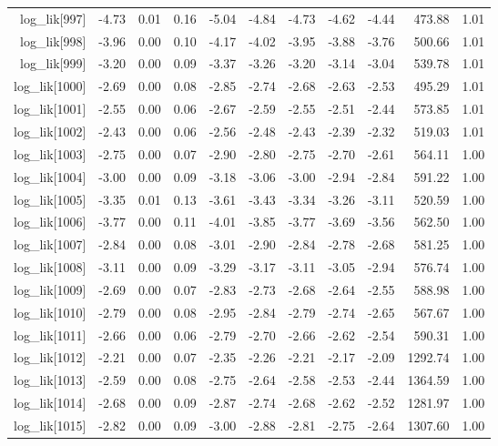 \begin{table}[ht]
\begin{tabular}{rrrrrrrrrrr}
  log\_lik[997] & -4.73 & 0.01 & 0.16 & -5.04 & -4.84 & -4.73 & -4.62 & -4.44 & 473.88 & 1.01 \\ 
  log\_lik[998] & -3.96 & 0.00 & 0.10 & -4.17 & -4.02 & -3.95 & -3.88 & -3.76 & 500.66 & 1.01 \\ 
  log\_lik[999] & -3.20 & 0.00 & 0.09 & -3.37 & -3.26 & -3.20 & -3.14 & -3.04 & 539.78 & 1.01 \\ 
  log\_lik[1000] & -2.69 & 0.00 & 0.08 & -2.85 & -2.74 & -2.68 & -2.63 & -2.53 & 495.29 & 1.01 \\ 
  log\_lik[1001] & -2.55 & 0.00 & 0.06 & -2.67 & -2.59 & -2.55 & -2.51 & -2.44 & 573.85 & 1.01 \\ 
  log\_lik[1002] & -2.43 & 0.00 & 0.06 & -2.56 & -2.48 & -2.43 & -2.39 & -2.32 & 519.03 & 1.01 \\ 
  log\_lik[1003] & -2.75 & 0.00 & 0.07 & -2.90 & -2.80 & -2.75 & -2.70 & -2.61 & 564.11 & 1.00 \\ 
  log\_lik[1004] & -3.00 & 0.00 & 0.09 & -3.18 & -3.06 & -3.00 & -2.94 & -2.84 & 591.22 & 1.00 \\ 
  log\_lik[1005] & -3.35 & 0.01 & 0.13 & -3.61 & -3.43 & -3.34 & -3.26 & -3.11 & 520.59 & 1.00 \\ 
  log\_lik[1006] & -3.77 & 0.00 & 0.11 & -4.01 & -3.85 & -3.77 & -3.69 & -3.56 & 562.50 & 1.00 \\ 
  log\_lik[1007] & -2.84 & 0.00 & 0.08 & -3.01 & -2.90 & -2.84 & -2.78 & -2.68 & 581.25 & 1.00 \\ 
  log\_lik[1008] & -3.11 & 0.00 & 0.09 & -3.29 & -3.17 & -3.11 & -3.05 & -2.94 & 576.74 & 1.00 \\ 
  log\_lik[1009] & -2.69 & 0.00 & 0.07 & -2.83 & -2.73 & -2.68 & -2.64 & -2.55 & 588.98 & 1.00 \\ 
  log\_lik[1010] & -2.79 & 0.00 & 0.08 & -2.95 & -2.84 & -2.79 & -2.74 & -2.65 & 567.67 & 1.00 \\ 
  log\_lik[1011] & -2.66 & 0.00 & 0.06 & -2.79 & -2.70 & -2.66 & -2.62 & -2.54 & 590.31 & 1.00 \\ 
  log\_lik[1012] & -2.21 & 0.00 & 0.07 & -2.35 & -2.26 & -2.21 & -2.17 & -2.09 & 1292.74 & 1.00 \\ 
  log\_lik[1013] & -2.59 & 0.00 & 0.08 & -2.75 & -2.64 & -2.58 & -2.53 & -2.44 & 1364.59 & 1.00 \\ 
  log\_lik[1014] & -2.68 & 0.00 & 0.09 & -2.87 & -2.74 & -2.68 & -2.62 & -2.52 & 1281.97 & 1.00 \\ 
  log\_lik[1015] & -2.82 & 0.00 & 0.09 & -3.00 & -2.88 & -2.81 & -2.75 & -2.64 & 1307.60 & 1.00 \\ 

\end{tabular}
\end{table}
